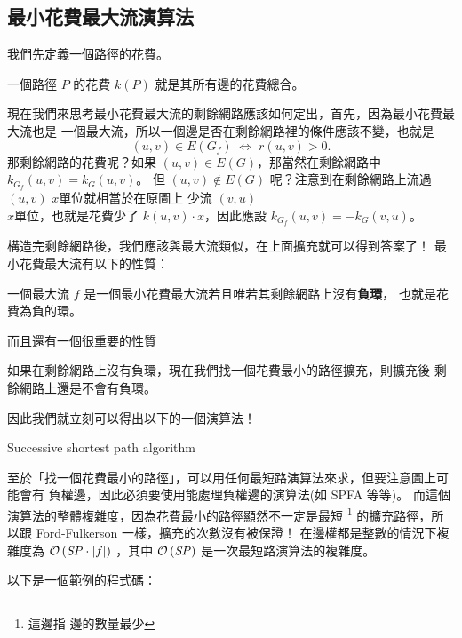 \documentclass[a4paper,12pt]{book}
\begin{document}
\subsection{最小花費最大流演算法}
我們先定義一個路徑的花費。
\begin{theorem}[定義]
  一個路徑 $P$ 的花費 $k(P)$ 就是其所有邊的花費總合。
\end{theorem}
現在我們來思考最小花費最大流的剩餘網路應該如何定出，首先，因為最小花費最大流也是
一個最大流，所以一個邊是否在剩餘網路裡的條件應該不變，也就是 
\[ (u, v) \in E(G_f) \;\Leftrightarrow\; r(u, v) > 0. \]
那剩餘網路的花費呢？如果 $(u, v) \in E(G)$，那當然在剩餘網路中 $k_{G_f}(u, v) = k_G(u, v)$。
但 $(u, v) \notin E(G)$ 呢？注意到在剩餘網路上流過 $(u, v)$ $x$單位就相當於在原圖上
少流 $(v, u)$ \\ 
$x$單位，也就是花費少了 $k(u, v) \cdot x$，因此應設 $k_{G_f}(u, v) = -k_G(v, u)$。

構造完剩餘網路後，我們應該與最大流類似，在上面擴充就可以得到答案了！
最小花費最大流有以下的性質：
\begin{theorem}[定理]
  一個最大流 $f$ 是一個最小花費最大流若且唯若其剩餘網路上沒有{\bf 負環}，
  也就是花費為負的環。
\end{theorem}
而且還有一個很重要的性質
\begin{theorem}[定理]
  如果在剩餘網路上沒有負環，現在我們找一個花費最小的路徑擴充，則擴充後
  剩餘網路上還是不會有負環。
\end{theorem}
因此我們就立刻可以得出以下的一個演算法！\\
\begin{algorithm}[H]
  \DontPrintSemicolon
  \caption{Successive shortest path algorithm}\label{euclid}
  \myalg{\FF{}} {
}
\end{algorithm}
至於「找一個花費最小的路徑」，可以用任何最短路演算法來求，但要注意圖上可能會有
負權邊，因此必須要使用能處理負權邊的演算法(如 SPFA 等等)。 
而這個演算法的整體複雜度，因為花費最小的路徑顯然不一定是最短 \footnote{這邊指
  邊的數量最少} 的擴充路徑，所以跟 Ford-Fulkerson 一樣，擴充的次數沒有被保證！
在邊權都是整數的情況下複雜度為 $\operatorname{\mathcal{O}}\left(\mathit{SP} \cdot \lvert f \rvert\right)$ ，其中
$\operatorname{\mathcal{O}}\left(\mathit{SP}\right)$ 是一次最短路演算法的複雜度。

以下是一個範例的程式碼：
\end{document}

